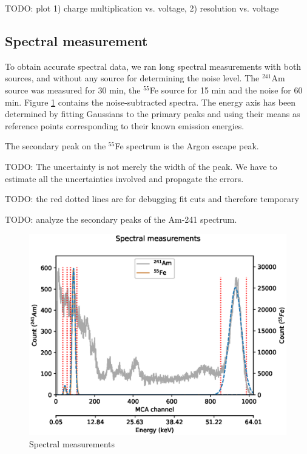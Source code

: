\documentclass[a4paper]{article}
\begin{document}
TODO: plot 1) charge multiplication vs. voltage, 2) resolution vs. voltage


\clearpage
\subsection{Spectral measurement}
\label{results_spectral}
To obtain accurate spectral data, we ran long spectral measurements with both sources, and without any source for determining the noise level.
The $^{241}$Am source was measured for 30 min, the $^{55}$Fe source for 15 min and the noise for 60 min.
Figure \ref{fig:spectra} contains the noise-subtracted spectra.
The energy axis has been determined by fitting Gaussians to the primary peaks and using their means as reference points corresponding to their known emission energies.

The secondary peak on the $^{55}$Fe spectrum is the Argon escape peak.

TODO: The uncertainty is not merely the width of the peak. We have to estimate all the uncertainties involved and propagate the errors.

TODO: the red dotted lines are for debugging fit cuts and therefore temporary

TODO: analyze the secondary peaks of the Am-241 spectrum.

\begin{figure}[ht!]
\centering
\includegraphics[width=\textwidth]{fig/python/spectra.eps}
\caption{Spectral measurements}
\label{fig:spectra}
\end{figure}
\end{document}
